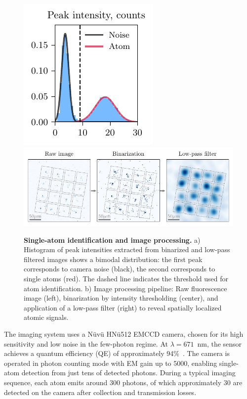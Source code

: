 

\begin{figure}
    \centering
    \includegraphics{fig-py/imaging-hist.pdf}
    \hfill
    \includegraphics{fig-py/imaging-base.pdf}
    \caption{
        \textbf{Single-atom identification and image processing.}
        a) Histogram of peak intensities extracted from binarized and low-pass filtered images shows a bimodal distribution: the first peak corresponds to camera noise (black), the second corresponds to single atoms (red). The dashed line indicates the threshold used for atom identification.
        b) Image processing pipeline: Raw fluorescence image (left), binarization by intensity thresholding (center), and application of a low-pass filter (right) to reveal spatially localized atomic signals. 
    }
    \label{fig:imaging}
\end{figure}

The imaging system uses a Nüvü HNü512 EMCCD camera, chosen for its high sensitivity and low noise in the few-photon regime. At $\lambda = 671$~nm, the sensor achieves a quantum efficiency (QE) of approximately 94\%~\cite{kruip_design_2024}. The camera is operated in photon counting mode with EM gain up to 5000, enabling single-atom detection from just tens of detected photons. During a typical imaging sequence, each atom emits around 300 photons, of which approximately 30 are detected on the camera after collection and transmission losses.

